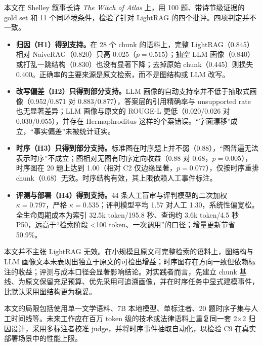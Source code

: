 本文在 Shelley 叙事长诗 \emph{The Witch of Atlas} 上，用 100 题、带诗节级证据的 gold set 和 11 个同环境条件，检验了针对 LightRAG 的四个批评。四项判定并不一致。

\begin{itemize}
\item \textbf{归因（H1）得到支持。}在 28 个 chunk 的语料上，完整 LightRAG（0.845）相对 NaiveRAG（0.820）只高 0.025（$p=0.515$）；抽空 LLM 画像（0.840）或打乱一跳结构（0.830）也没有显著下降；去掉原始 chunk（0.445）则损失 0.400。正确率的主要来源是原文检索，而不是图结构或 LLM 改写。
\item \textbf{改写偏差（H2）只得到部分支持。}LLM 画像的自动支持率并不低于抽取式画像（0.952/0.871 对 0.883/0.877），答案层的引用精确率与 unsupported rate 也无显著差异；LLM 画像与原文的 ROUGE-L 更低（0.020/0.026 对 0.030/0.055），并存在 Hermaphroditus 这样的个案错误。“字面漂移”成立，“事实偏差”未被统计证实。
\item \textbf{时序（H3）只得到部分支持。}标准图在时序题上并不弱（0.88），“图普遍无法表示时序”不成立；图相对无图有时序定向收益（0.88 对 0.68，$p=0.005$），时序图在 20 题上达到 1.00（相对 C2 仅边缘显著，$p=0.077$），仅按时序重排 chunk（0.68）无效。时序结构有效，其上限依赖人工事件标注。
\item \textbf{评测与部署（H4）得到支持。}44 条人工盲审与评判模型的二次加权 $\kappa=0.797$，严格 $\kappa=0.535$；评判模型平均 1.57 对人工 1.30，系统性偏宽松。全生命周期成本为索引 32.5k token/195.8 秒、查询约 3.6k token/4.5 秒 P50，远高于“检索阶段 <100 token、一次调用”的口径；增量更新节省 50.9\%。
\end{itemize}

本文并不主张 LightRAG 无效。在小规模且原文可完整检索的语料上，图结构与 LLM 画像文本未表现出独立于原文的可检出增益；时序图存在方向一致但依赖标注的收益；评测与成本口径会显著影响结论。对实践者而言，先建立 chunk 基线、为原文保留充足预算、优先采用可追溯画像，并在时序任务中显式建模事件，比默认采用图结构更为稳妥。

本文的局限包括使用单一文学语料、7B 本地模型、单标注者、20 题时序子集与人工时间线等。未来工作应在百万 token 级的技术或法律语料上重复同一套 2$\times$2 归因设计，采用多标注者校准 judge，并将时序事件抽取自动化，以检验 C9 在真实部署场景中的性能上限。